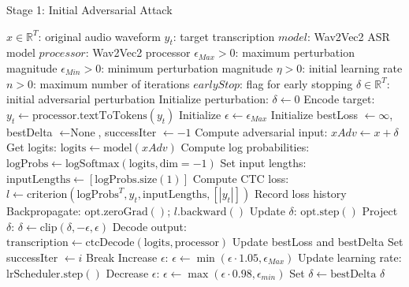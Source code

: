 \documentclass[../main.tex]{subfiles}
\begin{document}
\begin{enumerate}
\begin{breakablealgorithm}{Stage 1: Initial Adversarial Attack}
\begin{algorithmic}[1]
\Require
    \State $x \in \mathbb{R}^{T}$: original audio waveform
    \State $y_t$: target transcription
    \State $model$: Wav2Vec2 ASR model
    \State $processor$: Wav2Vec2 processor
    \State $\epsilon_{Max} > 0$: maximum perturbation magnitude
    \State $\epsilon_{Min} > 0$: minimum perturbation magnitude
    \State $\eta > 0$: initial learning rate
    \State $n > 0$: maximum number of iterations
    \State $earlyStop$: flag for early stopping
\Ensure $\delta \in \mathbb{R}^{T}$: initial adversarial perturbation
\State Initialize perturbation: $\delta \gets 0$
\State Encode target: $y_t \gets \text{processor.textToTokens}(y_t)$
\State Initialize $\epsilon \gets \epsilon_{Max}$
\State Initialize bestLoss $\gets \infty$, bestDelta $\gets \text{None}$, successIter $\gets -1$
    \State Compute adversarial input: $xAdv \gets x + \delta$
    \State Get logits: $\text{logits} \gets \text{model}(xAdv)$
    \State Compute log probabilities: $\text{logProbs} \gets \text{logSoftmax}(\text{logits}, \text{dim}=-1)$
    \State Set input lengths: $\text{inputLengths} \gets [\text{logProbs.size}(1)]$
    \State Compute CTC loss: $l \gets \text{criterion}(\text{logProbs}^T, y_t, \text{inputLengths}, [|y_t|])$
    \State Record loss history
    \State Backpropagate: $\text{opt.zeroGrad}()$; $l.\text{backward}()$
    \State Update $\delta$: $\text{opt.step}()$
    \State Project $\delta$: $\delta \gets \text{clip}(\delta, -\epsilon, \epsilon)$
    \State Decode output: $\text{transcription} \gets \text{ctcDecode}(\text{logits}, \text{processor})$
            \State Update bestLoss and bestDelta
        \EndIf
            \State Set successIter $\gets i$
        \EndIf
            \State Break
        \EndIf
        \State Increase $\epsilon$: $\epsilon \gets \min(\epsilon \cdot 1.05, \epsilon_{Max})$
    \EndIf
    \State Update learning rate: $\text{lrScheduler.step}()$
    \State Decrease $\epsilon$: $\epsilon \gets \max(\epsilon \cdot 0.98, \epsilon_{min})$
\EndFor
{}
    \State Set $\delta \gets \text{bestDelta}$
\EndIf
\State \Return $\delta$
\end{algorithmic}
\end{breakablealgorithm}


\end{enumerate}
\end{document}

